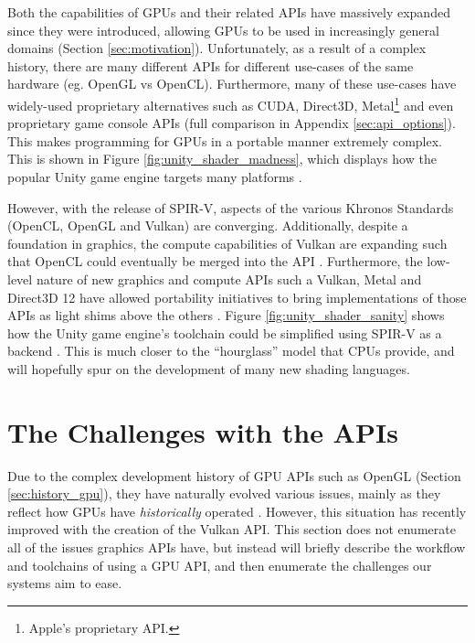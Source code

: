 \documentclass[a4paper,12pt,twoside,openright]{report}
\begin{document}
Both the capabilities of GPUs and their related APIs have massively expanded
since they were introduced, allowing GPUs to be used in increasingly general
domains (Section \ref{sec:motivation}). Unfortunately, as a result of a complex
history, there are many different APIs for different use-cases of the same
hardware (eg. OpenGL vs OpenCL). Furthermore, many of these use-cases have
widely-used proprietary alternatives such as CUDA, Direct3D,
Metal\footnote{Apple's proprietary API.} and even proprietary game console APIs
\cite{CUDA} \cite{Metal} \cite{Direct3D} \cite{PS4PortCrew} (full comparison in
Appendix \ref{sec:api_options}). This makes programming for GPUs in a portable
manner extremely complex. This is shown in Figure
\ref{fig:unity_shader_madness}, which displays how the popular Unity game
engine targets many platforms \cite{UnityShaderPipeline}.

However, with the release of SPIR-V, aspects of the various Khronos Standards
(OpenCL, OpenGL and Vulkan) are converging. Additionally, despite a foundation
in graphics, the compute capabilities of Vulkan are expanding such that OpenCL
could eventually be merged into the API \cite{VulkanOpenCLMerge}. Furthermore,
the low-level nature of new graphics and compute APIs such a Vulkan, Metal and
Direct3D 12 have allowed portability initiatives to bring implementations of
those APIs as light shims above the others \cite{VulkanPortabilityInitiative}
\cite{VulkanPortabilityInitiativeAnnouncement}. Figure
\ref{fig:unity_shader_sanity} shows how the Unity game engine's toolchain could
be simplified using SPIR-V as a backend \cite{UnityShaderPipeline}. This is
much closer to the ``hourglass'' model that CPUs provide, and will hopefully
spur on the development of many new shading languages.

\section{The Challenges with the APIs}

\label{sec:api_challanges}



Due to the complex development history of GPU APIs such as OpenGL (Section
\ref{sec:history_gpu}), they have naturally evolved various issues, mainly as
they reflect how GPUs have \textit{historically} operated
\cite{VulkanAnnouncement}. However, this situation has recently improved with
the creation of the Vulkan API. This section does not enumerate all of the
issues graphics APIs have, but instead will briefly describe the workflow and
toolchains of using a GPU API, and then enumerate the challenges our systems
aim to ease.
\end{document}
